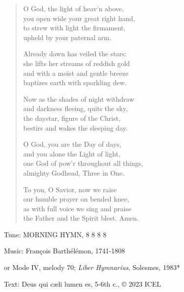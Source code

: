 \hymn

\begin{verse}
O God, the light of heav’n above,\\
you open wide your great right hand,\\
to strew with light the firmament,\\
upheld by your paternal arm.

Already dawn has veiled the stars:\\
she lifts her streams of reddish gold\\
and with a moist and gentle breeze\\
baptizes earth with sparkling dew.

Now as the shades of night withdraw\\
and darkness fleeing, quits the sky,\\
the daystar, figure of the Christ,\\
bestirs and wakes the sleeping day.

O God, you are the Day of days,\\
and you alone the Light of light,\\
one God of pow’r throughout all things,\\
almighty Godhead, Three in One.

To you, O Savior, now we raise\\
our humble prayer on bended knee,\\
as with full voice we sing and praise\\
the Father and the Spirit blest. Amen.
\end{verse}

\begin{hymnsource}
Tune: MORNING HYMN, 8 8 8 8

Music: François Barthélémon, 1741-1808

or Mode IV, melody 70; \emph{Liber Hymnarius}, Solesmes, 1983*

Text: Deus qui cæli lumen es, 5-6th c., © 2023 ICEL
\end{hymnsource}